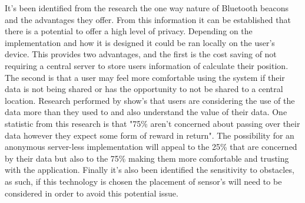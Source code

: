 It's been identified from the research the one way nature of Bluetooth beacons and the advantages they offer. From this information it can be established that there is a potential to offer a high level of privacy. Depending on the implementation and how it is designed it could be ran locally on the user's device. This provides two advantages, and the first is the cost saving of not requiring a central server to store users information of calculate their position. The second is that a user may feel more comfortable using the system if their data is not being shared or has the opportunity to not be shared to a central location. Research performed by \cite{axel_2018_how} show's that users are considering the use of the data more than they used to and also understand the value of their data. One statistic from this research is that "75\% aren't concerned about passing over their data however they expect some form of reward in return". The possibility for an anonymous server-less implementation will appeal to the 25\% that are concerned by their data but also to the 75\% making them more comfortable and trusting with the application. Finally it's also been identified the sensitivity to obstacles, as such, if this technology is chosen the placement of sensor's will need to be considered in order to avoid this potential issue.

